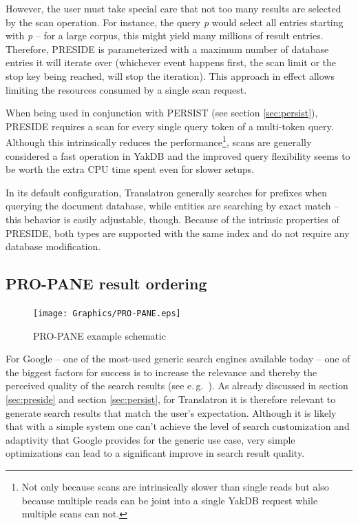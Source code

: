 \documentclass[a4paper, 12pt, twoside, reqn]{report}
\numberwithin{figure}{chapter}
\newtheorem[L]{boxedDefinition}{Definition}
\newtheorem[L]{boxedExample}{Example}
\newcommand{\eg}{e.\,g.\ }
\begin{document}
However, the user must take special care that not too many results are selected by the scan operation. For instance, the query \textit{p} would select all entries starting with \textit{p} -- for a large corpus, this might yield many millions of result entries. Therefore, PRESIDE is parameterized with a maximum number of database entries it will iterate over (whichever event happens first, the scan limit or the stop key being reached, will stop the iteration). This approach in effect allows limiting the resources consumed by a single scan request.

When being used in conjunction with PERSIST (see section \ref{sec:persist}), PRESIDE requires a scan for every single query token of a multi-token query. Although this intrinsically reduces the performance\footnote{Not only because scans are intrinsically slower than single reads but also because multiple reads can be joint into a single YakDB request while multiple scans can not.}, scans are generally considered a fast operation in YakDB and the improved query flexibility seems to be worth the extra CPU time spent even for slower setups.

In its default configuration, Translatron generally searches for prefixes when querying the document database, while entities are searching by exact match -- this behavior is easily adjustable, though. Because of the intrinsic properties of PRESIDE, both types are supported with the same index and do not require any database modification.


\subsection{PRO-PANE result ordering}\label{sec:pro-pane}

\begin{figure}[!htb]
  \centering
  \texttt{[image: Graphics/PRO-PANE.eps]}
  \caption{PRO-PANE example schematic}
  \label{fig:pro-pane}
\end{figure}

For Google -- one of the most-used generic search engines available today -- one of the biggest factors for success is to increase the relevance and thereby the perceived quality of the search results (see \eg \cite{pant2000computer}). As already discussed in section \ref{sec:preside} and section \ref{sec:persist}, for Translatron it is therefore relevant to generate search results that match the user's expectation. Although it is likely that with a simple system one can't achieve the level of search customization and adaptivity that Google provides for the generic use case, very simple optimizations can lead to a significant improve in search result quality.
\end{document}
